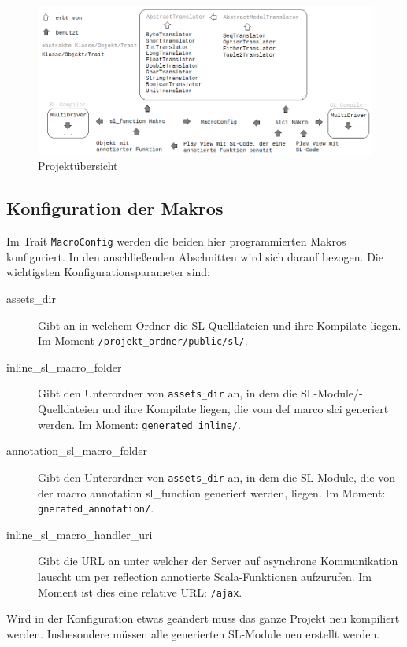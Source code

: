 \documentclass[12pt,bibtotoc]{scrreprt}
\begin{document}
\begin{figure}[h] 
  \centering
     \includegraphics[width=\textwidth]{Bilder/projektstruktur}
  \caption{Projektübersicht}
  \label{fig:project-overview}
\end{figure}

\subsection{Konfiguration der Makros}
\label{subsec:macro-config}

Im Trait \lstinline!MacroConfig! werden die beiden hier programmierten Makros konfiguriert. In den anschließenden Abschnitten wird sich darauf bezogen. Die wichtigsten Konfigurationsparameter sind:

\begin{description}
 \item[assets\_dir] Gibt an in welchem Ordner die SL-Quelldateien und ihre Kompilate liegen. Im Moment \lstinline!/projekt_ordner/public/sl/!.
 \item[inline\_sl\_macro\_folder] Gibt den Unterordner von \lstinline!assets_dir! an, in dem die SL-Module/-Quelldateien und ihre Kompilate liegen, die vom def marco slci generiert werden. Im Moment: \lstinline!generated_inline/!.
 \item[annotation\_sl\_macro\_folder] Gibt den Unterordner von \lstinline!assets_dir! an, in dem die SL-Module, die von der macro annotation sl\_function generiert werden, liegen. Im Moment: \lstinline!gnerated_annotation/!.
 \item[inline\_sl\_macro\_handler\_uri] Gibt die \ac{URL} an unter welcher der Server auf asynchrone Kommunikation lauscht um per reflection annotierte Scala-Funktionen aufzurufen. Im Moment ist dies eine relative \ac{URL}: \lstinline!/ajax!.
\end{description}

Wird in der Konfiguration etwas geändert muss das ganze Projekt neu kompiliert werden. Insbesondere müssen alle generierten SL-Module neu erstellt werden.
\end{document}
